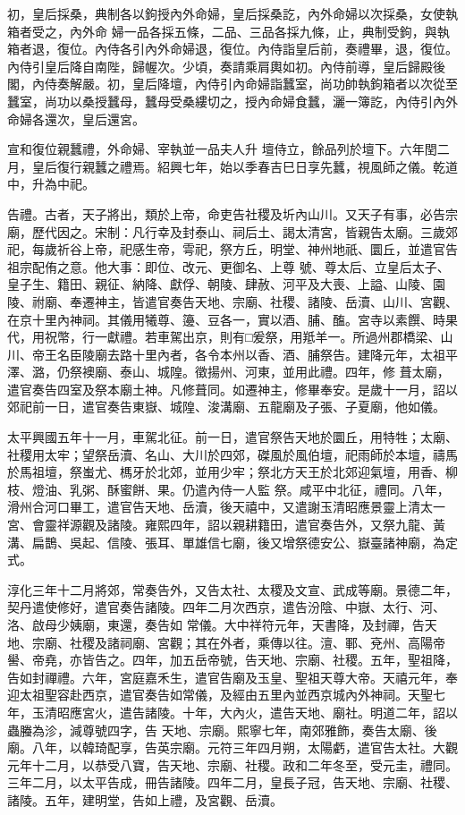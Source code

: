 \begin{pinyinscope}
 初，皇后採桑，典制各以鉤授內外命婦，皇后採桑訖，內外命婦以次採桑，女使執箱者受之，內外命
 婦一品各採五條，二品、三品各採九條，止，典制受鉤，與執箱者退，復位。內侍各引內外命婦退，復位。內侍詣皇后前，奏禮畢，退，復位。內侍引皇后降自南陛，歸幄次。少頃，奏請乘肩輿如初。內侍前導，皇后歸殿後閣，內侍奏解嚴。初，皇后降壇，內侍引內命婦詣蠶室，尚功帥執鉤箱者以次從至蠶室，尚功以桑授蠶母，蠶母受桑縷切之，授內命婦食蠶，灑一簿訖，內侍引內外命婦各還次，皇后還宮。



 宣和復位親蠶禮，外命婦、宰執並一品夫人升
 壇侍立，餘品列於壇下。六年閏二月，皇后復行親蠶之禮焉。紹興七年，始以季春吉巳日享先蠶，視風師之儀。乾道中，升為中祀。



 告禮。古者，天子將出，類於上帝，命吏告社稷及圻內山川。又天子有事，必告宗廟，歷代因之。宋制：凡行幸及封泰山、祠后土、謁太清宮，皆親告太廟。三歲郊祀，每歲祈谷上帝，祀感生帝，雩祀，祭方丘，明堂、神州地祇、圜丘，並遣官告祖宗配侑之意。他大事：即位、改元、更御名、上尊
 號、尊太后、立皇后太子、皇子生、籍田、親征、納降、獻俘、朝陵、肆赦、河平及大喪、上謚、山陵、園陵、祔廟、奉遷神主，皆遣官奏告天地、宗廟、社稷、諸陵、岳瀆、山川、宮觀、在京十里內神祠。其儀用犧尊、籩、豆各一，實以酒、脯、醢。宮寺以素饌、時果代，用祝幣，行一獻禮。若車駕出京，則有□爰祭，用羝羊一。所過州郡橋梁、山川、帝王名臣陵廟去路十里內者，各令本州以香、酒、脯祭告。建降元年，太祖平澤、潞，仍祭襖廟、泰山、城隍。徵揚州、河東，並用此禮。四年，修
 葺太廟，遣官奏告四室及祭本廟土神。凡修葺同。如遷神主，修畢奉安。是歲十一月，詔以郊祀前一日，遣官奏告東嶽、城隍、浚溝廟、五龍廟及子張、子夏廟，他如儀。



 太平興國五年十一月，車駕北征。前一日，遣官祭告天地於圜丘，用特牲；太廟、社稷用太牢；望祭岳瀆、名山、大川於四郊，磔風於風伯壇，祀雨師於本壇，禱馬於馬祖壇，祭蚩尤、榪牙於北郊，並用少牢；祭北方天王於北郊迎氣壇，用香、柳枝、燈油、乳粥、酥蜜餅、果。仍遣內侍一人監
 祭。咸平中北征，禮同。八年，滑州合河口畢工，遣官告天地、岳瀆，後天禧中，又遣謝玉清昭應景靈上清太一宮、會靈祥源觀及諸陵。雍熙四年，詔以親耕籍田，遣官奏告外，又祭九龍、黃溝、扁鵲、吳起、信陵、張耳、單雄信七廟，後又增祭德安公、嶽臺諸神廟，為定式。



 淳化三年十二月將郊，常奏告外，又告太社、太稷及文宣、武成等廟。景德二年，契丹遣使修好，遣官奏告諸陵。四年二月次西京，遣告汾陰、中嶽、太行、河、洛、啟母少姨廟，東還，奏告如
 常儀。大中祥符元年，天書降，及封禪，告天地、宗廟、社稷及諸祠廟、宮觀；其在外者，乘傳以往。澶、鄆、兗州、高陽帝嚳、帝堯，亦皆告之。四年，加五岳帝號，告天地、宗廟、社稷。五年，聖祖降，告如封禪禮。六年，宮庭嘉禾生，遣官告廟及玉皇、聖祖天尊大帝。天禧元年，奉迎太祖聖容赴西京，遣官奏告如常儀，及經由五里內並西京城內外神祠。天聖七年，玉清昭應宮火，遣告諸陵。十年，大內火，遣告天地、廟社。明道二年，詔以蟲螣為沴，減尊號四字，告
 天地、宗廟。熙寧七年，南郊雅飾，奏告太廟、後廟。八年，以韓琦配享，告英宗廟。元符三年四月朔，太陽虧，遣官告太社。大觀元年十二月，以恭受八寶，告天地、宗廟、社稷。政和二年冬至，受元圭，禮同。三年二月，以太平告成，冊告諸陵。四年二月，皇長子冠，告天地、宗廟、社稷、諸陵。五年，建明堂，告如上禮，及宮觀、岳瀆。




\end{pinyinscope}
